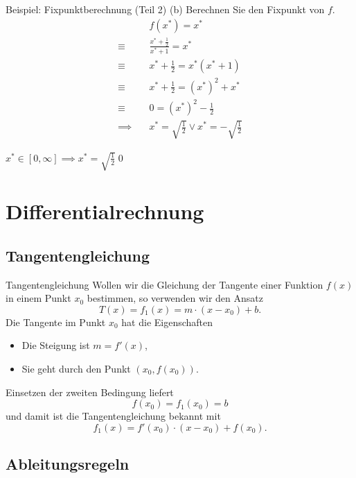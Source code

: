 \documentclass[german]{spicker}
\begin{document}
\begin{bonus}{Beispiel: Fixpunktberechnung (Teil 2)}
    (b) Berechnen Sie den Fixpunkt von $f$.
    $$
        \begin{aligned}
                           & f(x^*) = x^*                                            \\
            \equiv \quad   & \frac{x^*+\frac{1}{2}}{x^*+1} = x^*                     \\
            \equiv \quad   & x^*+\frac{1}{2} = x^*(x^*+1)                            \\
            \equiv \quad   & x^*+\frac{1}{2} = (x^*)^2+x^*                           \\
            \equiv \quad   & 0 = (x^*)^2-\frac{1}{2}                                 \\
            \implies \quad & x^* = \sqrt{\frac{1}{2}} \lor x^* = -\sqrt{\frac{1}{2}}
        \end{aligned}
    $$

    $x^* \in [0,\infty] \implies x^* = \sqrt{\frac{1}{2}}$\qed
\end{bonus}

\section{Differentialrechnung}
\subsection{Tangentengleichung}

\begin{algo}{Tangentengleichung}
    Wollen wir die Gleichung der Tangente einer Funktion $f(x)$ in einem Punkt $x_0$ bestimmen, so verwenden wir den Ansatz
    $$
        T(x) = f_1(x) = m \cdot (x-x_0) + b.
    $$
    Die Tangente im Punkt $x_0$ hat die Eigenschaften
    \begin{itemize}
        \item Die Steigung ist $m = f'(x)$,
        \item Sie geht durch den Punkt $(x_0, f(x_0))$.
    \end{itemize}

    Einsetzen der zweiten Bedingung liefert
    $$
        f(x_0) = f_1(x_0) = b
    $$
    und damit ist die Tangentengleichung bekannt mit
    $$
        f_1(x) = f'(x_0) \cdot (x-x_0) + f(x_0).
    $$
\end{algo}

\newpage
\subsection{Ableitungsregeln}
\end{document}
